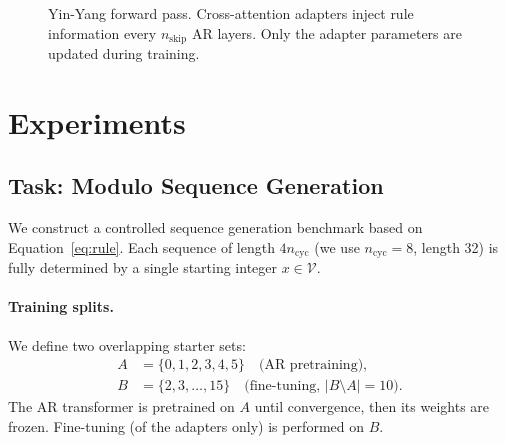 \documentclass[10pt,twocolumn]{article}
\begin{document}
\begin{figure}[t]
\centering
{}
\caption{Yin-Yang forward pass. Cross-attention adapters inject rule information every $n_\text{skip}$ AR layers. Only the adapter parameters are updated during training.}
\label{fig:arch}
\end{figure}

\section{Experiments}

\subsection{Task: Modulo Sequence Generation}

We construct a controlled sequence generation benchmark based on Equation~\eqref{eq:rule}. Each sequence of length $4n_\text{cyc}$ (we use $n_\text{cyc}=8$, length 32) is fully determined by a single starting integer $x \in \mathcal{V}$.

\paragraph{Training splits.}
We define two overlapping starter sets:
\begin{align*}
  A &= \{0, 1, 2, 3, 4, 5\} \quad \text{(AR pretraining)},\\
  B &= \{2, 3, \ldots, 15\} \quad \text{(fine-tuning, }|B \setminus A| = 10\text{)}.
\end{align*}
The AR transformer is pretrained on $A$ until convergence, then its weights are frozen. Fine-tuning (of the adapters only) is performed on $B$.
\end{document}
